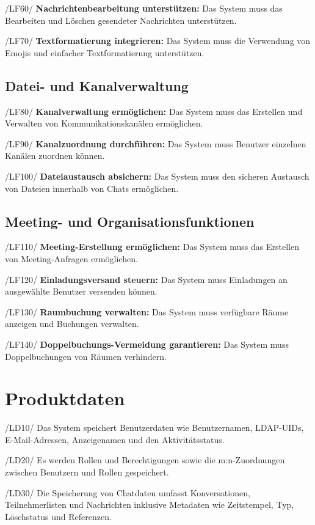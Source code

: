 \documentclass[12pt,a4paper]{extarticle}
\begin{document}
/LF60/ \textbf{Nachrichtenbearbeitung unterstützen:} Das System muss das Bearbeiten und Löschen gesendeter Nachrichten unterstützen.

/LF70/ \textbf{Textformatierung integrieren:} Das System muss die Verwendung von Emojis und einfacher Textformatierung unterstützen.

\subsection{Datei- und Kanalverwaltung}

/LF80/ \textbf{Kanalverwaltung ermöglichen:} Das System muss das Erstellen und Verwalten von Kommunikationskanälen ermöglichen.

/LF90/ \textbf{Kanalzuordnung durchführen:} Das System muss Benutzer einzelnen Kanälen zuordnen können.

/LF100/ \textbf{Dateiaustausch absichern:} Das System muss den sicheren Austausch von Dateien innerhalb von Chats ermöglichen.

\newpage
\subsection{Meeting- und Organisationsfunktionen}

/LF110/ \textbf{Meeting-Erstellung ermöglichen:} Das System muss das Erstellen von Meeting-Anfragen ermöglichen.

/LF120/ \textbf{Einladungsversand steuern:} Das System muss Einladungen an ausgewählte Benutzer versenden können.

/LF130/ \textbf{Raumbuchung verwalten:} Das System muss verfügbare Räume anzeigen und Buchungen verwalten.

/LF140/ \textbf{Doppelbuchungs-Vermeidung garantieren:} Das System muss Doppelbuchungen von Räumen verhindern.  
 

\vspace{1cm}
\section{Produktdaten}

/LD10/ Das System speichert Benutzerdaten wie Benutzernamen, LDAP-UIDs, E-Mail-Adressen, Anzeigenamen und den Aktivitätsstatus.

/LD20/ Es werden Rollen und Berechtigungen sowie die m:n-Zuordnungen zwischen Benutzern und Rollen gespeichert.

/LD30/ Die Speicherung von Chatdaten umfasst Konversationen, Teilnehmerlisten und Nachrichten inklusive Metadaten wie Zeitstempel, Typ, Löschstatus und Referenzen.
\end{document}
